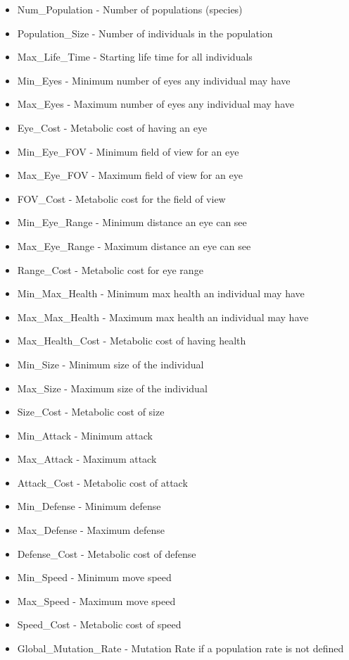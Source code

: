 \begin{itemize}[noitemsep]
	\item Num\_Population - Number of populations (species)
	\item Population\_Size - Number of individuals in the population
	\item Max\_Life\_Time - Starting life time for all individuals
	\item Min\_Eyes - Minimum number of eyes any individual may have
	\item Max\_Eyes - Maximum number of eyes any individual may have
	\item Eye\_Cost - Metabolic cost of having an eye
	\item Min\_Eye\_FOV - Minimum field of view for an eye
	\item Max\_Eye\_FOV - Maximum field of view for an eye
	\item FOV\_Cost - Metabolic cost for the field of view
	\item Min\_Eye\_Range - Minimum distance an eye can see
	\item Max\_Eye\_Range - Maximum distance an eye can see
	\item Range\_Cost - Metabolic cost for eye range
	\item Min\_Max\_Health - Minimum max health an individual may have
	\item Max\_Max\_Health - Maximum max health an individual may have
	\item Max\_Health\_Cost - Metabolic cost of having health
 	\item Min\_Size - Minimum size of the individual
	\item Max\_Size - Maximum size of the individual
	\item Size\_Cost - Metabolic cost of size
	\item Min\_Attack - Minimum attack
	\item Max\_Attack - Maximum attack
	\item Attack\_Cost - Metabolic cost of attack
	\item Min\_Defense - Minimum defense
	\item Max\_Defense - Maximum defense
	\item Defense\_Cost - Metabolic cost of defense
	\item Min\_Speed - Minimum move speed
	\item Max\_Speed - Maximum move speed
	\item Speed\_Cost - Metabolic cost of speed
	\item Global\_Mutation\_Rate - Mutation Rate if a population rate is not defined

\end{itemize}
